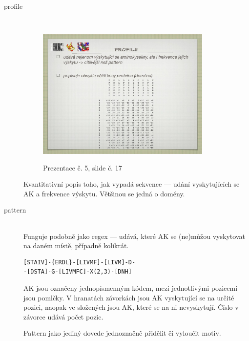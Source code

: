 \documentclass[DIV=8]{scrreprt}
\begin{document}
\begin{description}
\item[profile]\hfill \\
\begin{figure}
    \caption{Prezentace č. 5, slide č. 17}
    \includegraphics[width=0.85\textwidth]{slides-5/slide-17.jpg}
    \centering
    \label{slides-5-slide-17}
\end{figure}

Kvantitativní popis toho, jak vypadá sekvence --- udání vyskytujících se AK a frekvence výskytu. Většinou se jedná o domény.


\item[pattern]\hfill \\
Funguje podobně jako regex --- udává, které AK se (ne)můžou vyskytovat na daném místě, případně kolikrát.

\begin{lstlisting}
[STAIV]-{ERDL}-[LIVMF]-[LIVM]-D-
-[DSTA]-G-[LIVMFC]-X(2,3)-[DNH]\end{lstlisting}

AK jsou označeny jednopísmenným kódem, mezi jednotlivými pozicemi jsou pomlčky. V hranatách závorkách jsou AK vyskytující se na určité pozici, naopak ve složených jsou AK, které se na ni nevyskytují. Číslo v závorce udává počet pozic.

Pattern jako jediný dovede jednoznačně přidělit či vyloučit motiv.

\end{description}
\end{document}
